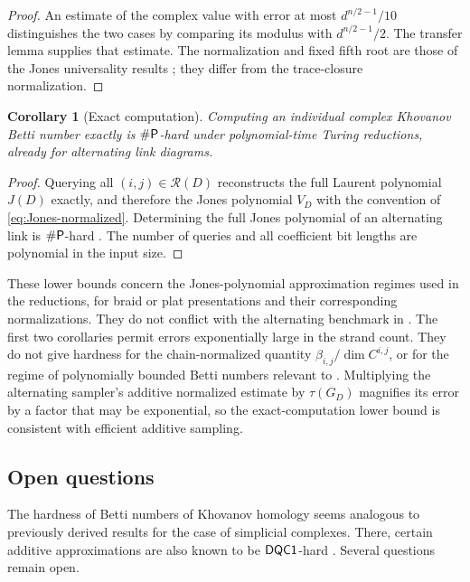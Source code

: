 \documentclass[a4paper,onecolumn,unpublished]{quantumarticle}
\theoremstyle{plain}
\newtheorem{corollary}[theorem]{Corollary}
\theoremstyle{definition}
\theoremstyle{definition}
\numberwithin{equation}{section}
\begin{document}
\begin{proof}
An estimate of the complex value with error at most \(d^{n/2-1}/10\) distinguishes the two cases by comparing its modulus with \(d^{n/2-1}/2\). The transfer lemma supplies that estimate. The normalization and fixed fifth root are those of the Jones universality results \cite{FreedmanLarsenWang2002,aharonov2011bqp}; they differ from the trace-closure normalization.
\end{proof}

\begin{corollary}[Exact computation]
\label{cor:sharpP}
Computing an individual complex Khovanov Betti number exactly is \(\#\mathsf{P}\)-hard under polynomial-time Turing reductions, already for alternating link diagrams.
\end{corollary}

\begin{proof}
Querying all \((i,j)\in\mathcal R(D)\) reconstructs the full Laurent polynomial \(J(D)\) exactly, and therefore the Jones polynomial \(V_D\) with the convention of \cref{eq:Jones-normalized}. Determining the full Jones polynomial of an alternating link is \(\#\mathsf{P}\)-hard \cite[Theorem 3]{JaegerVertiganWelsh1990}. The number of queries and all coefficient bit lengths are polynomial in the input size.
\end{proof}

These lower bounds concern the Jones-polynomial approximation regimes used in the reductions, for braid or plat presentations and their corresponding normalizations. They do not conflict with the alternating benchmark in . The first two corollaries permit errors exponentially large in the strand count. They do not give hardness for the chain-normalized quantity \(\beta_{i,j}/\dim C^{i,j}\), or for the regime of polynomially bounded Betti numbers relevant to . Multiplying the alternating sampler's additive normalized estimate by \(\tau(G_D)\) magnifies its error by a factor that may be exponential, so the exact-computation lower bound is consistent with efficient additive sampling.

\subsection{Open questions}

The hardness of Betti numbers of Khovanov homology seems analogous to previously derived results for the case of simplicial complexes. There, certain additive approximations are also known to be \(\mathsf{DQC1}\)-hard \cite{quantumAdvantage,cade2021complexity}. Several questions remain open.
\end{document}
